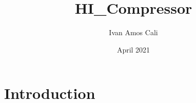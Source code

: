 \documentclass{article}
\title{HI_Compressor}
\author{Ivan Amos Cali}
\date{April 2021}
\begin{document}
\maketitle

\section{Introduction}
\end{document}
